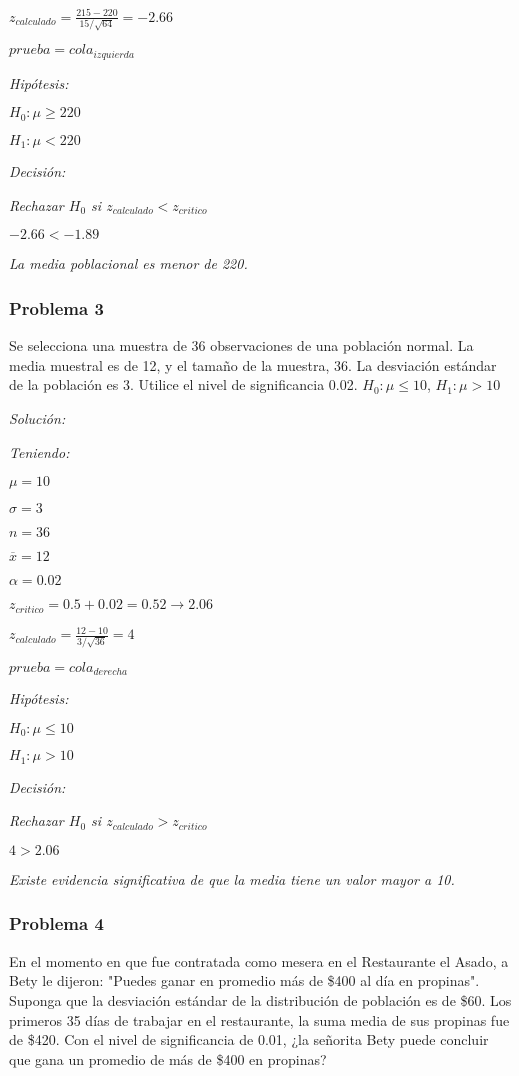 \documentclass[a4paper, 12pt]{article}
\begin{document}
$z_{calculado}=\frac{215-220}{15/\sqrt{64}}=-2.66$

$prueba=cola_{izquierda}$

\emph{Hipótesis:}

$H_0:\mu\geq 220$

$H_1:\mu<220$

\emph{Decisión:}

\emph{Rechazar $H_0$ si $z_{calculado}<z_{critico}$}

$-2.66<-1.89$

\emph{La media poblacional es menor de 220.}

\subsubsection{Problema 3}
Se selecciona una muestra de 36 observaciones de una población normal. La media muestral es de 12, y el tamaño de la muestra, 36. La desviación estándar de la población es 3. Utilice el nivel de significancia 0.02. $H_0:\mu\leq 10$, $H_1:\mu>10$

\emph{Solución:}

\emph{Teniendo:}

$\mu=10$

$\sigma=3$

$n=36$

$\overline{x}=12$

$\alpha=0.02$

$z_{critico}=0.5+0.02=0.52\to 2.06$

$z_{calculado}=\frac{12-10}{3/\sqrt{36}}=4$

$prueba=cola_{derecha}$

\emph{Hipótesis:}

$H_0:\mu\leq 10$

$H_1:\mu>10$

\emph{Decisión:}

\emph{Rechazar $H_0$ si $z_{calculado}>z_{critico}$}

$4>2.06$

\emph{Existe evidencia significativa de que la media tiene un valor mayor a 10.}

\subsubsection{Problema 4}
En el momento en que fue contratada como mesera en el Restaurante el Asado, a Bety le dijeron: "Puedes ganar en promedio más de \$400 al día en propinas". Suponga que la desviación estándar de la distribución de población es de \$60. Los primeros 35 días de trabajar en el restaurante, la suma media de sus propinas fue de \$420. Con el nivel de significancia de 0.01, ¿la señorita Bety puede concluir que gana un promedio de más de \$400 en propinas?
\end{document}
